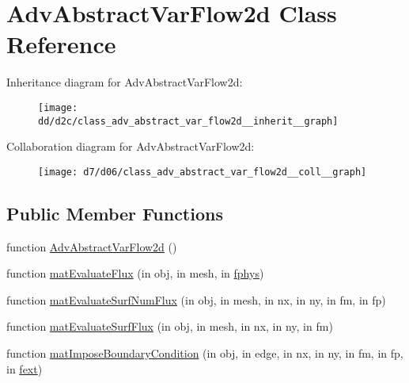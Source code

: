 \hypertarget{class_adv_abstract_var_flow2d}{}\section{Adv\+Abstract\+Var\+Flow2d Class Reference}
\label{class_adv_abstract_var_flow2d}


Inheritance diagram for Adv\+Abstract\+Var\+Flow2d\+:
\nopagebreak
\begin{figure}[H]
\begin{center}
\leavevmode
\texttt{[image: dd/d2c/class\_adv\_abstract\_var\_flow2d\_\_inherit\_\_graph]}
\end{center}
\end{figure}


Collaboration diagram for Adv\+Abstract\+Var\+Flow2d\+:
\nopagebreak
\begin{figure}[H]
\begin{center}
\leavevmode
\texttt{[image: d7/d06/class\_adv\_abstract\_var\_flow2d\_\_coll\_\_graph]}
\end{center}
\end{figure}
\subsection*{Public Member Functions}
\begin{DoxyCompactItemize}
\item 
function \hyperlink{class_adv_abstract_var_flow2d_ad402f150cc82fa22684bc9fa4e80250e}{Adv\+Abstract\+Var\+Flow2d} ()
\item 
function \hyperlink{class_adv_abstract_var_flow2d_a244e953b918a20029f7f3768b346fc9d}{mat\+Evaluate\+Flux} (in obj, in mesh, in \hyperlink{class_ndg_phys_a6b25724fc9474d32018439009072f0a9}{fphys})
\item 
function \hyperlink{class_adv_abstract_var_flow2d_ac3d1eeef828f75e080a5ab447096379d}{mat\+Evaluate\+Surf\+Num\+Flux} (in obj, in mesh, in nx, in ny, in fm, in fp)
\item 
function \hyperlink{class_adv_abstract_var_flow2d_adc1f4c3906e8a54fc810874e0069569c}{mat\+Evaluate\+Surf\+Flux} (in obj, in mesh, in nx, in ny, in fm)
\item 
function \hyperlink{class_adv_abstract_var_flow2d_a34a7a79146625f8b0e0d4a0d711d688e}{mat\+Impose\+Boundary\+Condition} (in obj, in edge, in nx, in ny, in fm, in fp, in \hyperlink{class_ndg_phys_mat_a2b0e8a77bf5f6fe870b12e400d6d83f3}{fext})
\end{DoxyCompactItemize}
